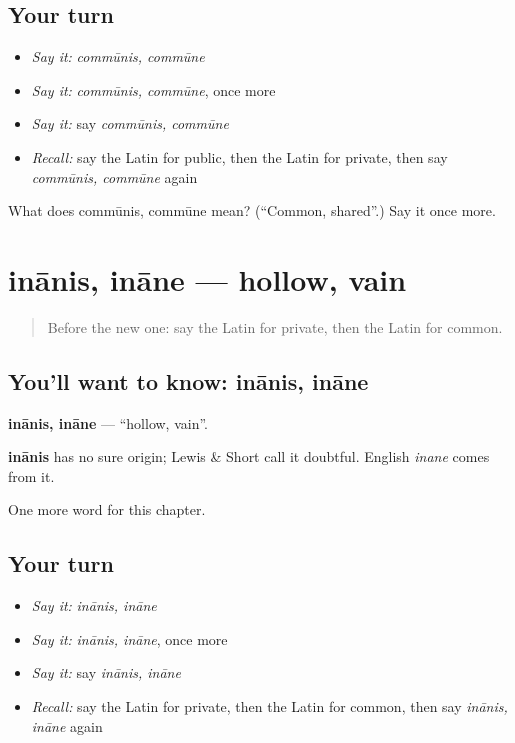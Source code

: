\subsection*{Your turn}
\begin{itemize}
\raggedright
  \item \emph{Say it:} \emph{commūnis, commūne}
  \item \emph{Say it:} \emph{commūnis, commūne}, once more
  \item \emph{Say it:} say \emph{commūnis, commūne}
  \item \emph{Recall:} say the Latin for public, then the Latin for private, then say \emph{commūnis, commūne} again
\end{itemize}

\begin{tcolorbox}[breakable,colback=teal!4,colframe=teal!35!black,title={Before you move on}]
What does commūnis, commūne mean? (\textquotedblleft{}Common, shared\textquotedblright{}.) Say it once more.
\end{tcolorbox}
\section[inānis, ināne]{inānis, ināne — hollow, vain}

\label{lesson:LA-C182-inanis}



\begin{quote}
Before the new one: say the Latin for private, then the Latin for common.
\end{quote}

\subsection*{You'll want to know: inānis, ināne}
\textbf{inānis, ināne} — \textquotedblleft{}hollow, vain\textquotedblright{}.

\begin{cousinweb}
\textbf{inānis} has no sure origin; Lewis \& Short call it doubtful. English \emph{inane} comes from it.
\end{cousinweb}

\begin{grammarlens}[title={What you've built}]
One more word for this chapter.
\end{grammarlens}

\subsection*{Your turn}
\begin{itemize}
\raggedright
  \item \emph{Say it:} \emph{inānis, ināne}
  \item \emph{Say it:} \emph{inānis, ināne}, once more
  \item \emph{Say it:} say \emph{inānis, ināne}
  \item \emph{Recall:} say the Latin for private, then the Latin for common, then say \emph{inānis, ināne} again
\end{itemize}

